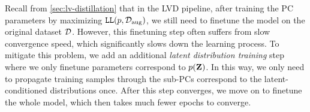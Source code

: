 \documentclass{article} %
\newcommand{\guy}[1]{\textcolor{blue}{\textbf{[Guy: #1]}}}
\begin{document}


Recall from \cref{sec:lv-distillation} that in the LVD pipeline, after training the PC parameters by maximizing $\mathtt{LL} ({p}, \mathcal{D}_{\mathrm{aug}})$, we still need to finetune the model on the original dataset $\mathcal{D}$. However, this finetuning step often suffers from slow convergence speed, which significantly slows down the learning process. To mitigate this problem, we add an additional \emph{latent distribution training} step where we only finetune parameters correspond to ${p}(\mathbf{Z})$. In this way, we only need to propagate training samples through the sub-PCs correspond to the latent-conditioned distributions once. After this step converges, we move on to finetune the whole model, which then takes much fewer epochs to converge.

\end{document}
